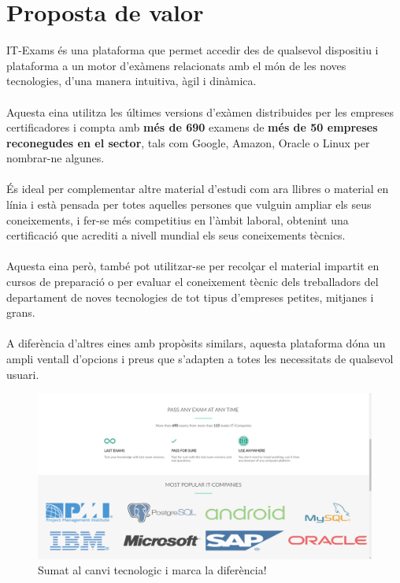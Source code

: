 \documentclass[12pt]{article}
\begin{document}
\section{Proposta de valor}
IT-Exams és una plataforma que permet accedir des de qualsevol dispositiu i plataforma a un motor d'exàmens relacionats amb el món de les noves tecnologies, d'una manera intuitiva, àgil i dinàmica. 
\\\\Aquesta eina utilitza les últimes versions d'exàmen distribuides per les empreses certificadores i compta amb \textbf{més de 690} examens de \textbf{més de 50 empreses reconegudes en el sector}, tals com Google, Amazon, Oracle o Linux per nombrar-ne algunes. 
\\\\És ideal per complementar altre material d'estudi com ara llibres o material en línia i està pensada per totes aquelles persones que vulguin ampliar els seus coneixements, i fer-se més competitius en l'àmbit laboral, obtenint una certificació que acrediti a nivell mundial els seus coneixements tècnics. 
\\\\Aquesta eina però, també pot utilitzar-se per recolçar el material impartit en cursos de preparació o per evaluar el coneixement tècnic dels treballadors del departament de noves tecnologies de tot tipus d'empreses petites, mitjanes i grans.
\\\\A diferència d'altres eines amb propòsits similars, aquesta plataforma dóna un ampli ventall d'opcions i preus que s'adapten a totes les necessitats de qualsevol usuari.
\begin{landscape}
\begin{figure}
	\centering
	\includegraphics[width=1.5\textwidth]{imatges/valor.png}\par\vspace{1cm}
	\caption{Sumat al canvi tecnologic i marca la diferència!}
\end{figure}
\end{landscape}
\end{document}
